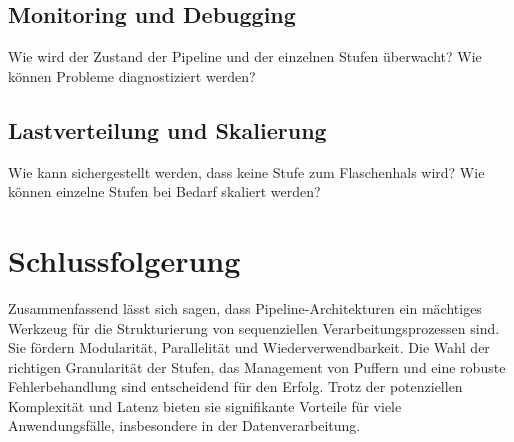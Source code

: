 \documentclass[a4paper]{article} %
\begin{document}
\subsection{Monitoring und Debugging}
Wie wird der Zustand der Pipeline und der einzelnen Stufen überwacht? Wie können Probleme diagnostiziert werden?
\blindtext[3]
\lipsum[22]

\subsection{Lastverteilung und Skalierung}
Wie kann sichergestellt werden, dass keine Stufe zum Flaschenhals wird? Wie können einzelne Stufen bei Bedarf skaliert werden?
\lipsum[23-25]
\blindtext[2]


\section{Schlussfolgerung}
Zusammenfassend lässt sich sagen, dass Pipeline-Architekturen ein mächtiges Werkzeug für die Strukturierung von sequenziellen Verarbeitungsprozessen sind. Sie fördern Modularität, Parallelität und Wiederverwendbarkeit. Die Wahl der richtigen Granularität der Stufen, das Management von Puffern und eine robuste Fehlerbehandlung sind entscheidend für den Erfolg. Trotz der potenziellen Komplexität und Latenz bieten sie signifikante Vorteile für viele Anwendungsfälle, insbesondere in der Datenverarbeitung.
\lipsum[26-28]
\blindtext
\end{document}
